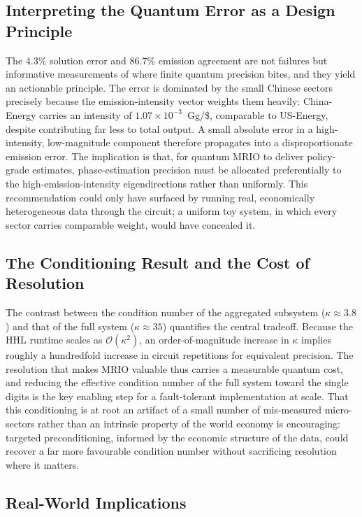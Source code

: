 \documentclass[letterpaper, 10 pt, conference]{ieeeconf}
\newcommand{\bigO}{\mathcal{O}}
\begin{document}
\subsection{Interpreting the Quantum Error as a Design Principle}

The $4.3\%$ solution error and $86.7\%$ emission agreement are not failures but informative measurements of where finite quantum precision bites, and they yield an actionable principle. The error is dominated by the small Chinese sectors precisely because the emission-intensity vector weights them heavily: China-Energy carries an intensity of $1.07\times10^{-3}$~Gg/\$, comparable to US-Energy, despite contributing far less to total output. A small absolute error in a high-intensity, low-magnitude component therefore propagates into a disproportionate emission error. The implication is that, for quantum MRIO to deliver policy-grade estimates, phase-estimation precision must be allocated preferentially to the high-emission-intensity eigendirections rather than uniformly. This recommendation could only have surfaced by running real, economically heterogeneous data through the circuit; a uniform toy system, in which every sector carries comparable weight, would have concealed it.

\subsection{The Conditioning Result and the Cost of Resolution}

The contrast between the condition number of the aggregated subsystem ($\kappa\approx3.8$) and that of the full system ($\kappa\approx35$) quantifies the central tradeoff. Because the HHL runtime scales as $\bigO(\kappa^2)$, an order-of-magnitude increase in $\kappa$ implies roughly a hundredfold increase in circuit repetitions for equivalent precision. The resolution that makes MRIO valuable thus carries a measurable quantum cost, and reducing the effective condition number of the full system toward the single digits is the key enabling step for a fault-tolerant implementation at scale. That this conditioning is at root an artifact of a small number of mis-measured micro-sectors rather than an intrinsic property of the world economy is encouraging: targeted preconditioning, informed by the economic structure of the data, could recover a far more favourable condition number without sacrificing resolution where it matters.

\subsection{Real-World Implications}
\end{document}
